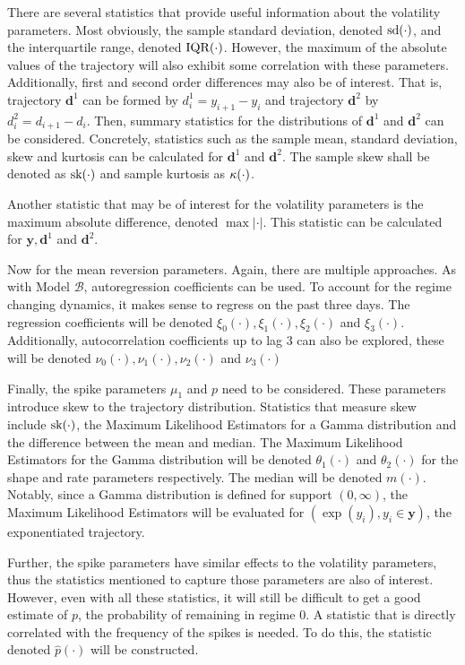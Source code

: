There are several statistics that provide useful information about the volatility parameters. Most obviously, the sample standard deviation, denoted $\mathop{}\!\text{sd}{(\cdot)}$, and the interquartile range, denoted $\mathop{}\!\text{IQR}{(\cdot)}$. However, the maximum of the absolute values of the trajectory will also exhibit some correlation with these parameters. Additionally, first and second order differences may also be of interest. That is, trajectory $\pmb{d}^1$ can be formed by $d^1_i = y_{i+1} - y_i$ and trajectory $\pmb{d}^2$ by $d^2_i = d_{i+1} - d_i$. Then, summary statistics for the distributions of $\pmb{d}^1$ and $\pmb{d}^2$ can be considered. Concretely, statistics such as the sample mean, standard deviation, skew and kurtosis can be calculated for $\pmb{d}^1$ and $\pmb{d}^2$. The sample skew shall be denoted as $\mathop{}\!\text{sk}{(\cdot)}$ and sample kurtosis as $\mathop{}\!\kappa{(\cdot)}$.

Another statistic that may be of interest for the volatility parameters is the maximum absolute difference, denoted $\max{|\cdot|}$. This statistic can be calculated for $\pmb{y}, \pmb{d}^1$ and $\pmb{d}^2$.

Now for the mean reversion parameters. Again, there are multiple approaches. As with Model $\mathcal{B}$, autoregression coefficients can be used. To account for the regime changing dynamics, it makes sense to regress on the past three days. The regression coefficients will be denoted $\xi_0(\cdot), \xi_1(\cdot), \xi_2(\cdot)$ and $\xi_3(\cdot)$. Additionally, autocorrelation coefficients up to lag 3 can also be explored, these will be denoted $\nu_0(\cdot), \nu_1(\cdot), \nu_2(\cdot)$ and $\nu_3(\cdot)$

Finally, the spike parameters $\mu_1$ and $p$ need to be considered. These parameters introduce skew to the trajectory distribution. Statistics that  measure skew include $\mathop{}\!\text{sk}{(\cdot)}$, the Maximum Likelihood Estimators for a Gamma distribution and the difference between the mean and median. The Maximum Likelihood Estimators for the Gamma distribution will be denoted $\theta_1(\cdot)$ and $\theta_2(\cdot)$ for the shape and rate parameters respectively. The median will be denoted $m(\cdot)$. Notably, since a Gamma distribution is defined for support $(0, \infty)$, the Maximum Likelihood Estimators will be evaluated for $(\exp(y_i), y_i \in \pmb{y})$, the exponentiated trajectory. 

Further, the spike parameters have similar effects to the volatility parameters, thus the statistics mentioned to capture those parameters are also of interest. However, even with all these statistics, it will still be difficult to get a good estimate of $p$, the probability of remaining in regime $0$. A statistic that is directly correlated with the frequency of the spikes is needed. To do this, the statistic denoted $\hat{p}(\cdot)$ will be constructed.

